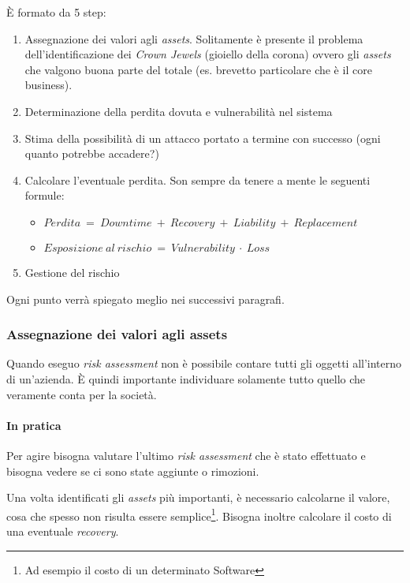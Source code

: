È formato da 5 step:
\begin{enumerate}
 \item Assegnazione dei valori agli \textit{assets}. Solitamente è presente
il problema dell'identificazione dei \textit{Crown Jewels} (gioiello della
corona) ovvero gli \textit{assets} che valgono buona parte del totale (es.
brevetto particolare che è il core business).
 \item Determinazione della perdita dovuta e vulnerabilità nel sistema
 \item Stima della possibilità di un attacco portato a termine con successo
(ogni quanto potrebbe accadere?)
 \item Calcolare l'eventuale perdita. Son sempre da tenere a mente le seguenti
formule:
 \begin{itemize}
 	\item $Perdita\ =\ Downtime\ +\ Recovery\ +\ Liability\ +\ Replacement$
 	\item $Esposizione\ al\ rischio\ =\ Vulnerability\ \cdot\ Loss$
 \end{itemize}
 \item Gestione del rischio
\end{enumerate}

Ogni punto verrà spiegato meglio nei successivi paragrafi.


\subsubsection{Assegnazione dei valori agli assets}

Quando eseguo \textit{risk assessment} non è possibile contare tutti gli 
oggetti all'interno di un'azienda. È quindi importante individuare solamente 
tutto quello che veramente conta per la società.

\paragraph*{In pratica}

Per agire bisogna valutare l'ultimo \textit{risk assessment} che è stato
effettuato e bisogna vedere se ci sono state aggiunte o rimozioni.

Una volta identificati gli \textit{assets} più importanti, è necessario
calcolarne il valore, cosa che spesso non risulta essere semplice\footnote{Ad
esempio il costo di un determinato Software}. Bisogna inoltre calcolare il 
costo di una eventuale \textit{recovery}.




